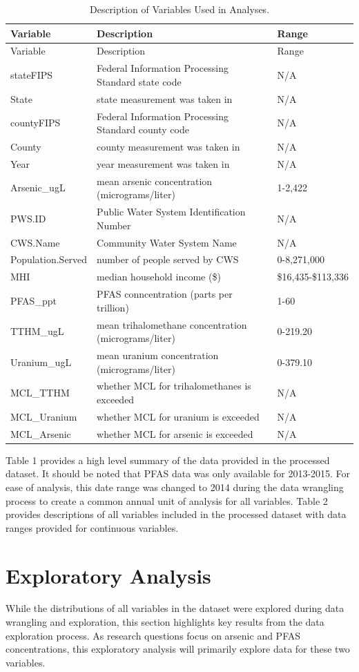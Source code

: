\documentclass[12pt,]{article}
\begin{document}
\begin{longtable}[]{@{}lll@{}}
\caption{Description of Variables Used in Analyses.}\tabularnewline
\toprule
Variable & Description & Range\tabularnewline
\midrule
\endfirsthead
\toprule
Variable & Description & Range\tabularnewline
\midrule
\endhead
stateFIPS & Federal Information Processing Standard state code &
N/A\tabularnewline
State & state measurement was taken in & N/A\tabularnewline
countyFIPS & Federal Information Processing Standard county code &
N/A\tabularnewline
County & county measurement was taken in & N/A\tabularnewline
Year & year measurement was taken in & N/A\tabularnewline
Arsenic\_ugL & mean arsenic concentration (micrograms/liter) &
1-2,422\tabularnewline
PWS.ID & Public Water System Identification Number & N/A\tabularnewline
CWS.Name & Community Water System Name & N/A\tabularnewline
Population.Served & number of people served by CWS &
0-8,271,000\tabularnewline
MHI & median household income (\$) & \$16,435-\$113,336\tabularnewline
PFAS\_ppt & PFAS conncentration (parts per trillion) &
1-60\tabularnewline
TTHM\_ugL & mean trihalomethane concentration (micrograms/liter) &
0-219.20\tabularnewline
Uranium\_ugL & mean uranium concentration (micrograms/liter) &
0-379.10\tabularnewline
MCL\_TTHM & whether MCL for trihalomethanes is exceeded &
N/A\tabularnewline
MCL\_Uranium & whether MCL for uranium is exceeded & N/A\tabularnewline
MCL\_Arsenic & whether MCL for arsenic is exceeded & N/A\tabularnewline
\bottomrule
\end{longtable}

Table 1 provides a high level summary of the data provided in the
processed dataset. It should be noted that PFAS data was only available
for 2013-2015. For ease of analysis, this date range was changed to 2014
during the data wrangling process to create a common annual unit of
analysis for all variables. Table 2 provides descriptions of all
variables included in the processed dataset with data ranges provided
for continuous variables.

\newpage

\hypertarget{exploratory-analysis}{%
\section{Exploratory Analysis}\label{exploratory-analysis}}

While the distributions of all variables in the dataset were explored
during data wrangling and exploration, this section highlights key
results from the data exploration process. As research questions focus
on arsenic and PFAS concentrations, this exploratory analysis will
primarily explore data for these two variables.
\end{document}
